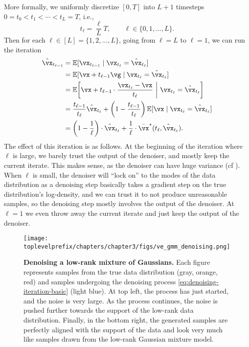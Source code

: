 \documentclass[../../book-main.tex]{subfiles}
\begin{document}
More formally, we uniformly discretize \([0, T]\) into \(L + 1\) timesteps \(0 = t_{0} < t_{1} < \cdots < t_{L} = T\), i.e.,
\begin{equation}
	t_{\ell} = \frac{\ell}{L}T, \qquad \ell \in \{0, 1, \dots, L\}.
\end{equation}
Then for each \(\ell \in [L] = \{1, 2, \dots, L\}\), going from \(\ell = L\) to \(\ell = 1\), we can run the iteration
\begin{align}
	\hat{\vx}_{t_{\ell - 1}}
	&= \Ex[\vx_{t_{\ell - 1}} \mid \vx_{t_{\ell}} = \hat{\vx}_{t_{\ell}}] \\
	&= \Ex[\vx + t_{\ell - 1}\vg \mid \vx_{t_{\ell}} = \hat{\vx}_{t_{\ell}}] \\
	&= \Ex\rs{\vx + t_{\ell - 1}\cdot\frac{\vx_{t_{\ell}} - \vx}{t_{\ell}} \given \vx_{t_{\ell}} = \hat{\vx}_{t_{\ell}}} \\
	&= \frac{t_{\ell - 1}}{t_{\ell}}\hat{\vx}_{t_{\ell}} + \bp{1 - \frac{t_{\ell - 1}}{t_{\ell}}}\Ex[\vx \mid \vx_{t_{\ell}} = \hat{\vx}_{t_{\ell}}] \\
	&= \bp{1 - \frac{1}{\ell}}\cdot\hat{\vx}_{t_{\ell}} + \frac{1}{\ell}\cdot\bar{\vx}^{\ast}(t_{\ell}, \hat{\vx}_{t_{\ell}}).
\end{align}
The effect of this iteration is as follows. At the beginning of the iteration where \(\ell\) is large, we barely trust the output of the denoiser, and mostly keep the current iterate. This makes sense, as the denoiser can have huge variance (cf ). When \(\ell\) is small, the denoiser will ``lock on'' to the modes of the data distribution as a denoising step basically takes a gradient step on the true distribution's log-density, and we can trust it to not produce unreasonable samples, so the denoising step mostly involves the output of the denoiser. At \(\ell = 1\) we even throw away the current iterate and just keep the output of the denoiser.

\begin{figure}[t]
	\centering
	\texttt{[image: \\toplevelprefix/chapters/chapter3/figs/ve\_gmm\_denoising.png]}
	\caption{\small\textbf{Denoising a low-rank mixture of Gaussians.} Each figure represents samples from the true data distribution (gray, orange, red) and samples undergoing the denoising process \eqref{eq:denoising-iteration-basic} (light blue). At top left, the process has just started, and the noise is very large. As the process continues, the noise is pushed further towards the support of the low-rank data distribution. Finally, in the bottom right, the generated samples are perfectly aligned with the support of the data and look very much like samples drawn from the low-rank Gaussian mixture model.}
	\label{fig:ve_gmm_denoising}
\end{figure}
\end{document}
